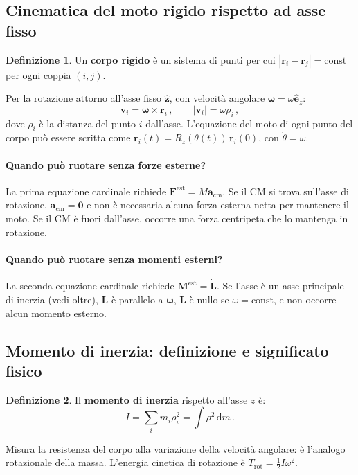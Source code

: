 \documentclass[11pt,a4paper]{article}
\renewcommand{\vec}[1]{\bm{#1}}
\newcommand{\ez}{\hat{\bm{e}}_z}
\newcommand{\om}{\vec{\omega}}
\newcommand{\CM}{\mathrm{cm}}
\theoremstyle{plain}
\theoremstyle{definition}
\newtheorem{definizione}{Definizione}[section]
\theoremstyle{remark}
\begin{document}
\subsection{Cinematica del moto rigido rispetto ad asse fisso}

\begin{definizione}
Un \textbf{corpo rigido} è un sistema di punti per cui
$|\vec{r}_i-\vec{r}_j|=\mathrm{const}$ per ogni coppia $(i,j)$.
\end{definizione}

Per la rotazione attorno all'asse fisso $\hat{\bm{z}}$, con velocità angolare
$\om=\omega\ez$:
\[
  \vec{v}_i=\om\times\vec{r}_i\,,\qquad |\vec{v}_i|=\omega\rho_i\,,
\]
dove $\rho_i$ è la distanza del punto $i$ dall'asse. L'equazione del moto di
ogni punto del corpo può essere scritta come
$\vec{r}_i(t)=R_z(\theta(t))\,\vec{r}_i(0)$, con $\dot\theta=\omega$.

\paragraph{Quando può ruotare senza forze esterne?}
La prima equazione cardinale richiede $\vec{F}^\mathrm{est}=M\vec{a}_\CM$.
Se il CM si trova sull'asse di rotazione, $\vec{a}_\CM=\vec{0}$ e non è
necessaria alcuna forza esterna netta per mantenere il moto. Se il CM è
fuori dall'asse, occorre una forza centripeta che lo mantenga in rotazione.

\paragraph{Quando può ruotare senza momenti esterni?}
La seconda equazione cardinale richiede $\vec{M}^\mathrm{est}=\dot{\vec{L}}$.
Se l'asse è un asse principale di inerzia (vedi oltre), $\vec{L}$ è parallelo
a $\vec{\omega}$, $\dot{\vec{L}}$ è nullo se $\omega=\mathrm{const}$, e non
occorre alcun momento esterno.

\subsection{Momento di inerzia: definizione e significato fisico}

\begin{definizione}
Il \textbf{momento di inerzia} rispetto all'asse $z$ è:
\[
  I=\sum_i m_i\rho_i^2=\int\rho^2\,\mathrm{d}m\,.
\]
\end{definizione}
Misura la resistenza del corpo alla variazione della velocità angolare: è
l'analogo rotazionale della massa. L'energia cinetica di rotazione è
$T_\mathrm{rot}=\tfrac{1}{2}I\omega^2$.
\end{document}
